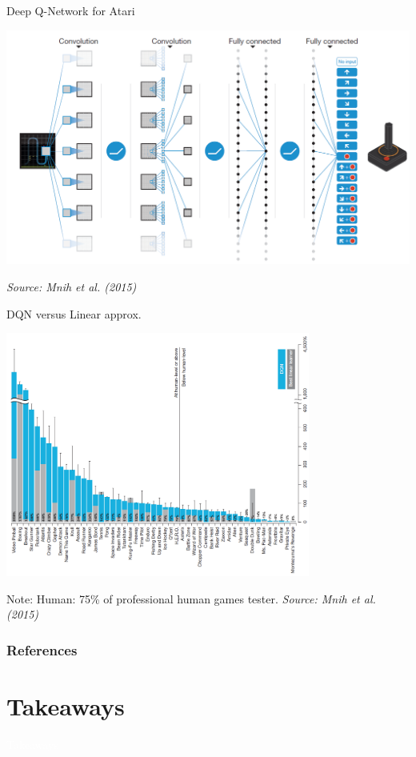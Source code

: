 \documentclass[11pt,table]{beamer}
\begin{document}
\begin{frame}{Deep Q-Network for Atari}
    \begin{center}
        \includegraphics[width=1\textwidth]{figures/17.png}
    \end{center}
\medskip
\hfill \footnotesize\textit{Source: Mnih et al. (2015)}
\end{frame}

\begin{frame}{DQN versus Linear approx.}
   \begin{center}
        \includegraphics[width=0.75\textwidth]{figures/18.png}
    \end{center} 
\medskip
\hfill\footnotesize Note: Human: 75\% of professional human games tester. \textit{Source: Mnih et al. (2015)}
\end{frame}


\begin{frame}[t,allowframebreaks
]%
\frametitle{References}
\small

\end{frame}
\section{Takeaways}
{
\begin{frame}
\centering
\Huge
\textcolor{white}{Takeaways}
\thispagestyle{empty}
\end{frame}
}
\end{document}
